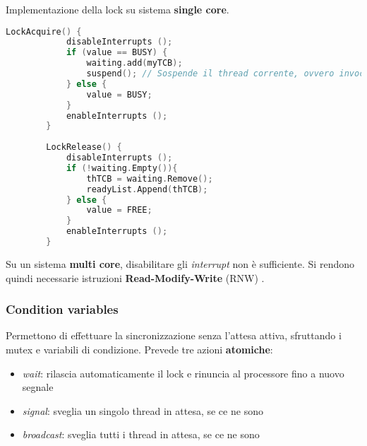 \begin{example}
	Implementazione della lock su sistema \textbf{single core}.
	\begin{lstlisting}[language=C]
		LockAcquire() {
			disableInterrupts ();
			if (value == BUSY) {
				waiting.add(myTCB);
				suspend(); // Sospende il thread corrente, ovvero invoca lo scheduler per fare il content switch, seleziona un altro TCB e abilita gli interrupt
			} else {
				value = BUSY;
			}
			enableInterrupts ();
		}
		
		LockRelease() {
			disableInterrupts ();
			if (!waiting.Empty()){
				thTCB = waiting.Remove();
				readyList.Append(thTCB);
			} else {
				value = FREE;
			}
			enableInterrupts ();
		}
	\end{lstlisting}
	Su un sistema \textbf{multi core}, disabilitare gli \textit{interrupt} non è sufficiente. Si rendono quindi necessarie istruzioni \textbf{Read-Modify-Write} (RNW) .
\end{example}

\subsubsection{Condition variables}
Permettono di effettuare la sincronizzazione senza l'attesa attiva, sfruttando i mutex e variabili di condizione. Prevede tre azioni \textbf{atomiche}:
\begin{itemize}
	\item \textit{wait}: rilascia automaticamente il lock e rinuncia al processore fino a nuovo segnale
	\item \textit{signal}: sveglia un singolo thread in attesa, se ce ne sono
	\item \textit{broadcast}: sveglia tutti i thread in attesa, se ce ne sono
\end{itemize}


